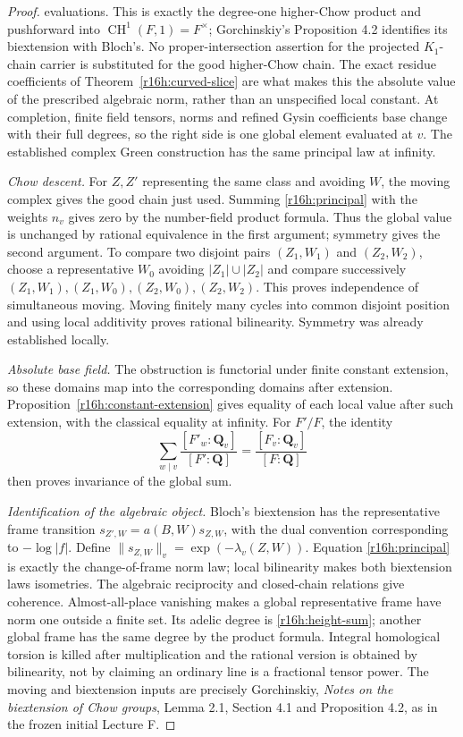 \begin{proof}
evaluations. This is exactly the degree-one higher-Chow product
and pushforward into $\operatorname{CH}^1(F,1)=F^\times$;
Gorchinskiy's Proposition 4.2 identifies its biextension with
Bloch's. No proper-intersection assertion for the projected
$K_1$-chain carrier is substituted for the good higher-Chow chain.
The exact residue coefficients of Theorem~\ref{r16h:curved-slice}
are what makes this the absolute value of the prescribed algebraic
norm, rather than an unspecified local constant. At completion, finite field tensors,
norms and refined Gysin coefficients base change with their full
degrees, so the right side is one global element evaluated at $v$.
The established complex Green construction has the same principal
law at infinity.

\emph{Chow descent.}
For $Z,Z'$ representing the same class and avoiding $W$, the moving
complex gives the good chain just used. Summing
\eqref{r16h:principal} with the weights $n_v$ gives zero by the
number-field product formula. Thus the global value is unchanged
by rational equivalence in the first argument; symmetry gives the
second argument. To compare two disjoint pairs $(Z_1,W_1)$ and
$(Z_2,W_2)$, choose a representative $W_0$ avoiding
$|Z_1|\cup|Z_2|$ and compare successively
$(Z_1,W_1),(Z_1,W_0),(Z_2,W_0),(Z_2,W_2)$. This proves independence
of simultaneous moving. Moving finitely many cycles into common
disjoint position and using local additivity proves rational
bilinearity. Symmetry was already established locally.

\emph{Absolute base field.}
The obstruction is functorial under finite constant extension, so
these domains map into the corresponding domains after extension.
Proposition~\ref{r16h:constant-extension} gives equality of each
local value after such extension, with the classical equality at
infinity. For $F'/F$, the identity
\[
 \sum_{w\mid v}\frac{[F'_w:\mathbf Q_v]}{[F':\mathbf Q]}
                        =\frac{[F_v:\mathbf Q_v]}{[F:\mathbf Q]}
\]
then proves invariance of the global sum.

\emph{Identification of the algebraic object.}
Bloch's biextension has the representative frame transition
$s_{Z',W}=a(B,W)s_{Z,W}$, with the dual convention corresponding
to $-\log|f|$. Define $\|s_{Z,W}\|_v=\exp(-\lambda_v(Z,W))$.
Equation \eqref{r16h:principal} is exactly the change-of-frame norm
law; local bilinearity makes both biextension laws isometries.
The algebraic reciprocity and closed-chain relations give coherence.
Almost-all-place vanishing makes a global representative frame have
norm one outside a finite set. Its adelic degree is
\eqref{r16h:height-sum}; another global frame has the same degree
by the product formula. Integral homological torsion is killed
after multiplication and the rational version is obtained by
bilinearity, not by claiming an ordinary line is a fractional
tensor power. The moving and biextension inputs are precisely
Gorchinskiy, \emph{Notes on the biextension of Chow groups}, Lemma
2.1, Section 4.1 and Proposition 4.2, as in the frozen initial
Lecture F.
\end{proof}

